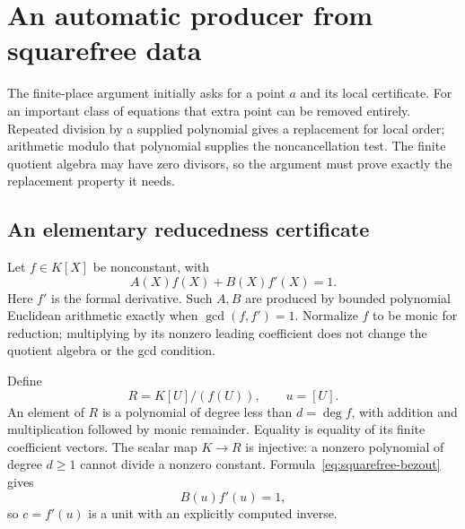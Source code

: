 \section{An automatic producer from squarefree data}
\label{sec:squarefree}

The finite-place argument initially asks for a point $a$ and its local certificate. For an important class of equations that extra point can be removed entirely. Repeated division by a supplied polynomial gives a replacement for local order; arithmetic modulo that polynomial supplies the noncancellation test. The finite quotient algebra may have zero divisors, so the argument must prove exactly the replacement property it needs.

\subsection{An elementary reducedness certificate}

Let $f\in K[X]$ be nonconstant, with
\begin{equation}\label{eq:squarefree-bezout}
 A(X)f(X)+B(X)f'(X)=1.
\end{equation}
Here $f'$ is the formal derivative. Such $A,B$ are produced by bounded polynomial Euclidean arithmetic exactly when $\gcd(f,f')=1$. Normalize $f$ to be monic for reduction; multiplying by its nonzero leading coefficient does not change the quotient algebra or the gcd condition.

Define
\[
 R=K[U]/(f(U)),\qquad u=[U].
\]
An element of $R$ is a polynomial of degree less than $d=\deg f$, with addition and multiplication followed by monic remainder. Equality is equality of its finite coefficient vectors. The scalar map $K\to R$ is injective: a nonzero polynomial of degree $d\ge1$ cannot divide a nonzero constant. Formula~\eqref{eq:squarefree-bezout} gives
\[
 B(u)f'(u)=1,
\]
so $c=f'(u)$ is a unit with an explicitly computed inverse.

